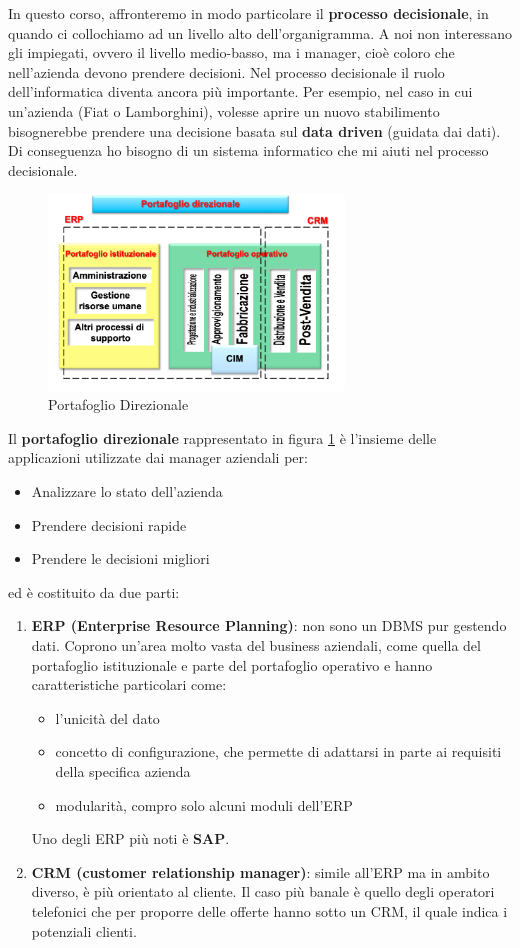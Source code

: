 In questo corso, affronteremo in modo particolare il \textbf{processo decisionale}, in quando ci collochiamo ad un livello alto dell’organigramma. A noi non interessano gli impiegati, ovvero il livello medio-basso, ma i manager, cioè coloro che nell’azienda devono prendere decisioni. Nel processo decisionale il ruolo dell’informatica diventa ancora più importante. Per esempio, nel caso in cui un’azienda (Fiat o Lamborghini), volesse aprire un nuovo stabilimento bisognerebbe prendere una decisione basata sul \textbf{data driven} (guidata dai dati). Di conseguenza ho bisogno di un sistema informatico che mi aiuti nel processo decisionale.

\begin{figure}[H]
	\centering
	\includegraphics[width=0.7\textwidth]{img/portafoglio}
	\caption{Portafoglio Direzionale}
	\label{fig:portafoglio}
\end{figure}
Il \textbf{portafoglio direzionale} rappresentato in figura \ref{fig:portafoglio} è l’insieme delle applicazioni utilizzate dai manager aziendali per:
\begin{itemize}
	\item 
	Analizzare lo stato dell’azienda
	\item 
	Prendere decisioni rapide
	\item 
	Prendere le decisioni migliori
\end{itemize}
ed è costituito da due parti:
\begin{enumerate}
	\item 
	\textbf{ERP (Enterprise Resource Planning)}: non sono un DBMS pur gestendo dati. Coprono un’area molto vasta del business aziendali, come quella del portafoglio istituzionale e parte del portafoglio operativo e hanno caratteristiche particolari come:
	\begin{itemize}
		\item
		l’unicità del dato
		\item 
		concetto di configurazione, che permette di adattarsi in parte ai 
		requisiti della specifica azienda
		\item 
		modularità, compro solo alcuni moduli dell’ERP
	\end{itemize}
	
	Uno degli ERP più noti è \textbf{SAP}.
	
	\item 
	\textbf{CRM (customer relationship manager)}: simile all’ERP ma in ambito diverso, è più orientato al cliente. Il caso più banale è quello degli operatori telefonici che per proporre delle offerte hanno sotto un CRM, il quale indica i potenziali clienti. 
	
\end{enumerate}
